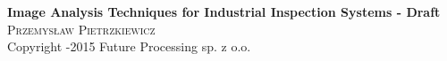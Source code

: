 \newcommand{\coverPage}[3]
{
	\begin{titlingpage}
	\begin{center}







	{ \huge \bfseries #2}\\[0.4cm]

	\textsc{\Large #1}\\[0.5cm]
	\null
	\vfill
	{\small #3}
	\end{center}
	\end{titlingpage}



	\thispagestyle{empty}	
	\newpage
}


\coverPage
{Przemys\l aw Pietrzkiewicz}
{Image Analysis Techniques for Industrial Inspection Systems - Draft}
{Copyright \textcopyright 2012-2015 Future Processing sp. z o.o.}
